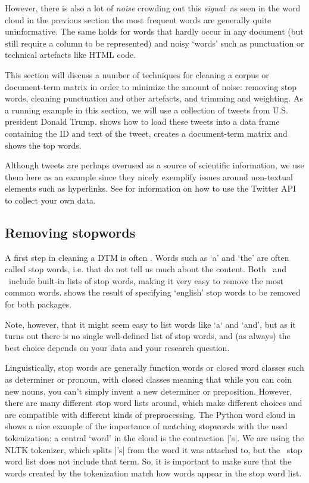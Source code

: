 However, there is also a lot of \emph{noise} crowding out this \emph{signal}:
as seen in the word cloud in the previous section the most frequent words are generally quite uninformative.
The same holds for words that hardly occur in any document (but still require a column to be represented)
and noisy `words' such as punctuation or technical artefacts like HTML code. 

This section will discuss a number of techniques for cleaning a corpus or document-term matrix in order to minimize the amount of noise: removing stop words, cleaning punctuation and other artefacts, and trimming and weighting.  
As a running example in this section, we will use a collection of tweets from U.S. president Donald Trump.
 shows how to load these tweets into a data frame containing the ID and text of the tweet,
creates a document-term matrix and shows the top words.


Although tweets are perhaps overused as a source of scientific information,
we use them here as an example since they nicely exemplify issues around non-textual elements such as hyperlinks.
See  for information on how to use the Twitter API to collect your own data.

\subsection{Removing stopwords}

A first step in cleaning a DTM is often .
Words such as `a' and `the' are often called stop words, i.e.  that do not tell us much about the content.
Both \quanteda\ and \sklearn\ include built-in lists of stop words, making it very easy to remove the most common words.
 shows the result of specifying `english' stop words to be removed for both packages.


Note, however, that it might seem easy to list words like `a` and `and',
but as it turns out there is no single well-defined list of stop words,
and (as always) the best choice depends on your data and your research question.

Linguistically, stop words are generally function words or closed word classes such as determiner or pronoun,
with closed classes meaning that while you can coin new nouns, you can't simply invent a new determiner or preposition.
However, there are many different stop word lists around, which make different choices and are compatible with
different kinds of preprocessing.
The Python word cloud in  shows a nice example of the importance of matching stopwords with the used
tokenization: a central `word' in the cloud is the contraction |'s|.
We are using the NLTK tokenizer, which splits |'s| from the word it was attached to, but the \sklearn\ stop word list
does not include that term.
So, it is important to make sure that the words created by the tokenization match how words appear in the stop word list.

